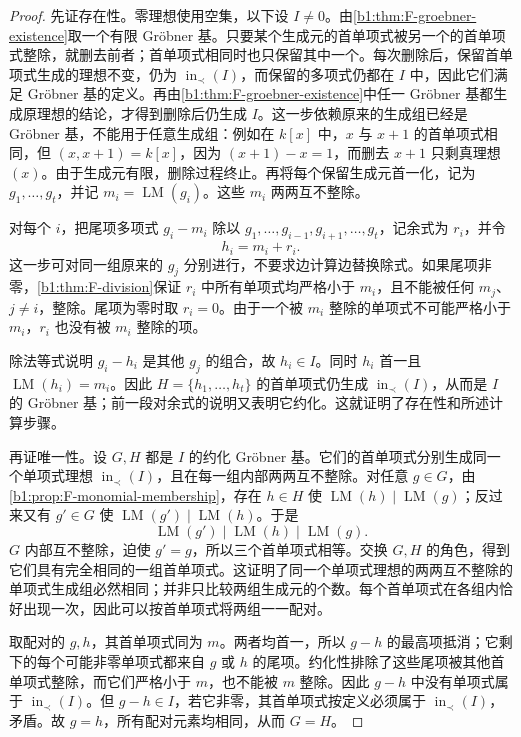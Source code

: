 \begin{proof}
	先证存在性。零理想使用空集，以下设 \(I\ne0\)。由\cref{b1:thm:F-groebner-existence}取一个有限 Gröbner 基。只要某个生成元的首单项式被另一个的首单项式整除，就删去前者；首单项式相同时也只保留其中一个。每次删除后，保留首单项式生成的理想不变，仍为 \(\operatorname{in}_\prec(I)\)，而保留的多项式仍都在 \(I\) 中，因此它们满足 Gröbner 基的定义。再由\cref{b1:thm:F-groebner-existence}中任一 Gröbner 基都生成原理想的结论，才得到删除后仍生成 \(I\)。这一步依赖原来的生成组已经是 Gröbner 基，不能用于任意生成组：例如在 \(k[x]\) 中，\(x\) 与 \(x+1\) 的首单项式相同，但 \((x,x+1)=k[x]\)，因为 \((x+1)-x=1\)，而删去 \(x+1\) 只剩真理想 \((x)\)。由于生成元有限，删除过程终止。再将每个保留生成元首一化，记为 \(g_1,\ldots,g_t\)，并记 \(m_i=\operatorname{LM}(g_i)\)。这些 \(m_i\) 两两互不整除。

	对每个 \(i\)，把尾项多项式 \(g_i-m_i\) 除以 \(g_1,\ldots,g_{i-1},g_{i+1},\ldots,g_t\)，记余式为 \(r_i\)，并令
	\[
		h_i=m_i+r_i.
	\]
	这一步可对同一组原来的 \(g_j\) 分别进行，不要求边计算边替换除式。如果尾项非零，\cref{b1:thm:F-division}保证 \(r_i\) 中所有单项式均严格小于 \(m_i\)，且不能被任何 \(m_j\)、\(j\ne i\)，整除。尾项为零时取 \(r_i=0\)。由于一个被 \(m_i\) 整除的单项式不可能严格小于 \(m_i\)，\(r_i\) 也没有被 \(m_i\) 整除的项。

	除法等式说明 \(g_i-h_i\) 是其他 \(g_j\) 的组合，故 \(h_i\in I\)。同时 \(h_i\) 首一且 \(\operatorname{LM}(h_i)=m_i\)。因此 \(H=\{h_1,\ldots,h_t\}\) 的首单项式仍生成 \(\operatorname{in}_\prec(I)\)，从而是 \(I\) 的 Gröbner 基；前一段对余式的说明又表明它约化。这就证明了存在性和所述计算步骤。

	再证唯一性。设 \(G,H\) 都是 \(I\) 的约化 Gröbner 基。它们的首单项式分别生成同一个单项式理想 \(\operatorname{in}_\prec(I)\)，且在每一组内部两两互不整除。对任意 \(g\in G\)，由\cref{b1:prop:F-monomial-membership}，存在 \(h\in H\) 使 \(\operatorname{LM}(h)\mid\operatorname{LM}(g)\)；反过来又有 \(g'\in G\) 使 \(\operatorname{LM}(g')\mid\operatorname{LM}(h)\)。于是
	\[
		\operatorname{LM}(g')\mid\operatorname{LM}(h)\mid\operatorname{LM}(g).
	\]
	\(G\) 内部互不整除，迫使 \(g'=g\)，所以三个首单项式相等。交换 \(G,H\) 的角色，得到它们具有完全相同的一组首单项式。这证明了同一个单项式理想的两两互不整除的单项式生成组必然相同；并非只比较两组生成元的个数。每个首单项式在各组内恰好出现一次，因此可以按首单项式将两组一一配对。

	取配对的 \(g,h\)，其首单项式同为 \(m\)。两者均首一，所以 \(g-h\) 的最高项抵消；它剩下的每个可能非零单项式都来自 \(g\) 或 \(h\) 的尾项。约化性排除了这些尾项被其他首单项式整除，而它们严格小于 \(m\)，也不能被 \(m\) 整除。因此 \(g-h\) 中没有单项式属于 \(\operatorname{in}_\prec(I)\)。但 \(g-h\in I\)，若它非零，其首单项式按定义必须属于 \(\operatorname{in}_\prec(I)\)，矛盾。故 \(g=h\)，所有配对元素均相同，从而 \(G=H\)。
\end{proof}

